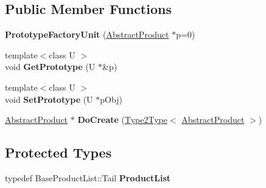 \subsection*{Public Member Functions}
\begin{DoxyCompactItemize}
\item 
\hypertarget{classLoki_1_1PrototypeFactoryUnit_a29a2ef1d4bfc3aa11546296cec26bd08}{}{\bfseries Prototype\+Factory\+Unit} (\hyperlink{classAbstractProduct}{Abstract\+Product} $\ast$p=0)\label{classLoki_1_1PrototypeFactoryUnit_a29a2ef1d4bfc3aa11546296cec26bd08}

\item 
\hypertarget{classLoki_1_1PrototypeFactoryUnit_a9f0920f3df1bef8cffb3252708ba673e}{}{\footnotesize template$<$class U $>$ }\\void {\bfseries Get\+Prototype} (U $\ast$\&p)\label{classLoki_1_1PrototypeFactoryUnit_a9f0920f3df1bef8cffb3252708ba673e}

\item 
\hypertarget{classLoki_1_1PrototypeFactoryUnit_a219625f195a706afbc14119a2260331b}{}{\footnotesize template$<$class U $>$ }\\void {\bfseries Set\+Prototype} (U $\ast$p\+Obj)\label{classLoki_1_1PrototypeFactoryUnit_a219625f195a706afbc14119a2260331b}

\item 
\hypertarget{classLoki_1_1PrototypeFactoryUnit_aa11f4ee1a6daed58b20ddb8ae9056736}{}\hyperlink{classAbstractProduct}{Abstract\+Product} $\ast$ {\bfseries Do\+Create} (\hyperlink{structLoki_1_1Type2Type}{Type2\+Type}$<$ \hyperlink{classAbstractProduct}{Abstract\+Product} $>$)\label{classLoki_1_1PrototypeFactoryUnit_aa11f4ee1a6daed58b20ddb8ae9056736}

\end{DoxyCompactItemize}
\subsection*{Protected Types}
\begin{DoxyCompactItemize}
\item 
\hypertarget{classLoki_1_1PrototypeFactoryUnit_ad9d2dd4c0dd271ab0a124ae247f56cd7}{}typedef Base\+Product\+List\+::\+Tail {\bfseries Product\+List}\label{classLoki_1_1PrototypeFactoryUnit_ad9d2dd4c0dd271ab0a124ae247f56cd7}

\end{DoxyCompactItemize}
